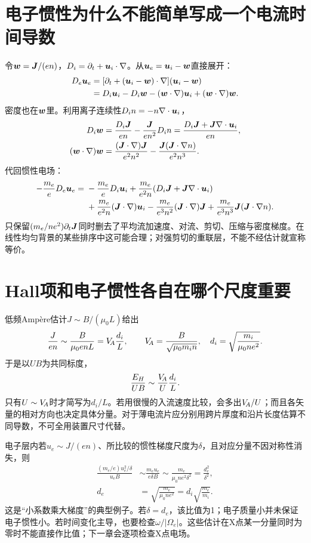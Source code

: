 \section{电子惯性为什么不能简单写成一个电流时间导数}
令$\bm{w}=\bm{J}/(en)$，$D_i=\partial_t+\bm{u}_i\cdot\nabla$。从$\bm{u}_e=\bm{u}_i-\bm{w}$直接展开：
\begin{align}
D_e\bm{u}_e
&=[\partial_t+(\bm{u}_i-\bm{w})\cdot\nabla](\bm{u}_i-\bm{w})\\
&=D_i\bm{u}_i-D_i\bm{w}-(\bm{w}\cdot\nabla)\bm{u}_i
 +(\bm{w}\cdot\nabla)\bm{w}.
\label{hall:eq:inertia-w}
\end{align}
密度也在$\bm{w}$里。利用离子连续性$D_in=-n\nabla\cdot\bm{u}_i$，
\begin{align}
D_i\bm{w}&=\frac{D_i\bm{J}}{en}-\frac{\bm{J}}{en^2}D_in
=\frac{D_i\bm{J}+\bm{J}\nabla\cdot\bm{u}_i}{en},\\
(\bm{w}\cdot\nabla)\bm{w}
&=\frac{(\bm{J}\cdot\nabla)\bm{J}}{e^2n^2}
-\frac{\bm{J}(\bm{J}\cdot\nabla n)}{e^2n^3}.
\end{align}
代回惯性电场：
\begin{align}
-\frac{m_e}{e}D_e\bm{u}_e={}&-\frac{m_e}{e}D_i\bm{u}_i
+\frac{m_e}{e^2n}(D_i\bm{J}+\bm{J}\nabla\cdot\bm{u}_i)\nonumber\\
&+\frac{m_e}{e^2n}(\bm{J}\cdot\nabla)\bm{u}_i
-\frac{m_e}{e^3n^2}(\bm{J}\cdot\nabla)\bm{J}
+\frac{m_e}{e^3n^3}\bm{J}(\bm{J}\cdot\nabla n).
\end{align}
只保留$(m_e/ne^2)\partial_t\bm{J}$同时删去了平均流加速度、对流、剪切、压缩与密度梯度。在线性均匀背景的某些排序中这可能合理；对强剪切的重联层，不能不经估计就宣称等价。

\section{Hall项和电子惯性各自在哪个尺度重要}
低频Ampère估计$J\sim B/(\mu_0L)$给出
\begin{equation}
\frac{J}{en}\sim\frac{B}{\mu_0enL}
=V_{\!A}\frac{d_i}{L},\qquad
V_{\!A}=\frac B{\sqrt{\mu_0m_in}},\quad
 d_i=\sqrt{\frac{m_i}{\mu_0ne^2}}.
\label{hall:eq:hall-scale}
\end{equation}
于是以$UB$为共同标度，
\begin{equation}
\frac{E_H}{UB}\sim\frac{V_{\!A}}{U}\frac{d_i}{L}.
\end{equation}
只有$U\sim V_{\!A}$时才简写为$d_i/L$。若用很慢的入流速度比较，会多出$V_{\!A}/U$；而且各矢量的相对方向也决定具体分量。对于薄电流片应分别用跨片厚度和沿片长度估算不同导数，不可全用装置尺寸代替。

电子层内若$u_e\sim J/(en)$、所比较的惯性梯度尺度为$\delta$，且对应分量不因对称性消失，则
\begin{align}
\frac{(m_e/e)u_e^2/\delta}{u_eB}
&\sim\frac{m_eu_e}{e\delta B}
\sim\frac{m_e}{\mu_0ne^2\delta^2}
=\frac{d_e^2}{\delta^2},\\
d_e&=\sqrt{\frac{m_e}{\mu_0ne^2}}=d_i\sqrt{\frac{m_e}{m_i}}.
\label{hall:eq:inertia-scale}
\end{align}
这是“小系数乘大梯度”的典型例子。若$\delta=d_e$，该比值为1；电子质量小并未保证电子惯性小。若时间变化主导，也要检查$\omega/|\Omega_e|$。这些估计在X点某一分量同时为零时不能直接作比值；下一章会逐项检查X点电场。

